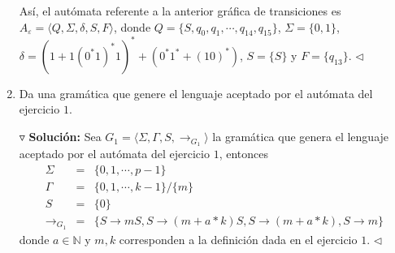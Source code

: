 \documentclass{article}
\begin{document}
\begin{enumerate}
\begin{center}
  \end{center}
  Así, el autómata referente a la anterior gráfica de transiciones es
  $A_{\varepsilon} = \langle Q, \Sigma, \delta, S, F\rangle$, donde
  $Q = \{S, q_0, q_1, \dotsm, q_{14}, q_{15}\}$, $\Sigma = \{0, 1\}$,
  $\delta =   (1 + 1(0^{*}1)^{*}1)^{*} + (0^{*}1^{*} + (10)^{*})$,
  $S = \{S\}$ y $F = \{q_{13}\}$.
  \hfill $\lhd$

\item Da una gramática que genere el lenguaje aceptado por el autómata del ejercicio $1$.
  
  $\triangledown$ \textbf{Solución:}
  Sea $G_{1} = \langle \Sigma, \Gamma, S, \rightarrow_{G_1}\rangle$ la gramática que genera
  el lenguaje aceptado por el autómata del ejercicio $1$, entonces
  \begin{eqnarray*}
    \Sigma &=& \{0,1, \dotsm, p-1\}\\
    \Gamma &=& \{0, 1, \dotsm, k - 1\}/\{m\}\\
    S      &=& \{0\}\\
    \rightarrow_{G_{1}} &=& \{S \rightarrow mS, S \rightarrow (m + a*k)S, S \rightarrow (m + a*k), S \rightarrow m\}
  \end{eqnarray*}
  donde $a \in \mathbb{N}$ y $m, k$ corresponden a la definición dada en el
  ejercicio $1$.
  \hfill $\lhd$
\end{enumerate}
\end{document}
